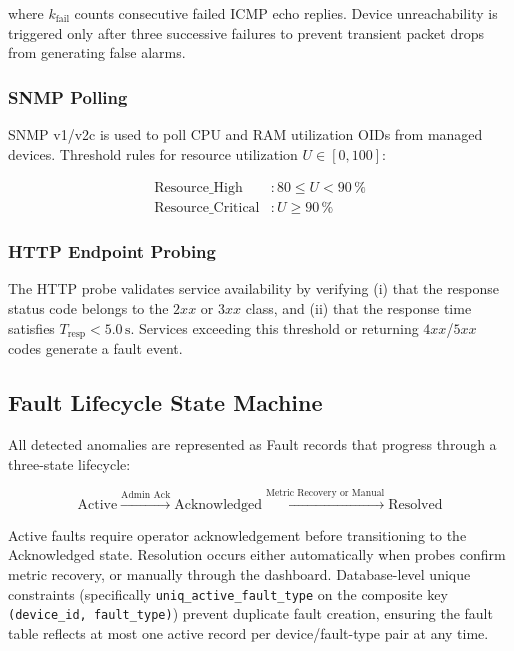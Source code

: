 \documentclass[conference]{IEEEtran}
\begin{document}
where $k_{\text{fail}}$ counts consecutive failed ICMP echo replies. Device unreachability is triggered only after three successive failures to prevent transient packet drops from generating false alarms.

\subsubsection{SNMP Polling}
SNMP v1/v2c is used to poll CPU and RAM utilization OIDs from managed devices. Threshold rules for resource utilization $U \in [0, 100]$:

\begin{align}
\text{Resource\_High}     &: 80 \le U < 90\,\% \label{eq:cpu_high}\\
\text{Resource\_Critical} &: U \ge 90\,\% \label{eq:cpu_crit}
\end{align}

\subsubsection{HTTP Endpoint Probing}
The HTTP probe validates service availability by verifying (i) that the response status code belongs to the $2xx$ or $3xx$ class, and (ii) that the response time satisfies $T_{\text{resp}} < 5.0\,\text{s}$. Services exceeding this threshold or returning $4xx$/$5xx$ codes generate a fault event.

\subsection{Fault Lifecycle State Machine}

All detected anomalies are represented as Fault records that progress through a three-state lifecycle:

\begin{equation}
\text{Active} \xrightarrow{\text{Admin Ack}} \text{Acknowledged} \xrightarrow{\text{Metric Recovery or Manual}} \text{Resolved}
\label{eq:fsm}
\end{equation}

Active faults require operator acknowledgement before transitioning to the Acknowledged state. Resolution occurs either automatically when probes confirm metric recovery, or manually through the dashboard. Database-level unique constraints (specifically \texttt{uniq\_active\_fault\_type} on the composite key \texttt{(device\_id, fault\_type)}) prevent duplicate fault creation, ensuring the fault table reflects at most one active record per device/fault-type pair at any time.
\end{document}
